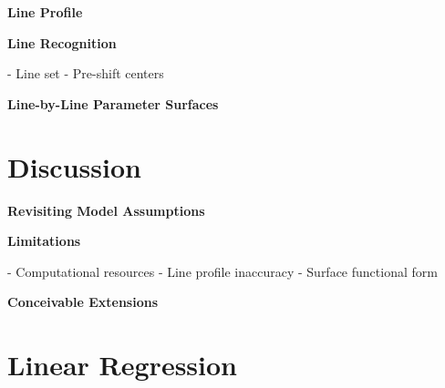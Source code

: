 \documentclass[twocolumn]{aastex631}
\begin{document}
\begin{mdframed}
    \textbf{Line Profile }

    \textcolor{lightgray}{\blindtext}
\end{mdframed}

\begin{mdframed}
    \textbf{Line Recognition}

    - Line set
    - Pre-shift centers

    \textcolor{lightgray}{\blindtext}
\end{mdframed}

\begin{mdframed}
    \textbf{Line-by-Line Parameter Surfaces}

    \textcolor{lightgray}{\blindtext}
\end{mdframed}


\section{Discussion}
\begin{mdframed}
    \textbf{Revisiting Model Assumptions}

   \textcolor{lightgray}{\blindtext}
\end{mdframed}

\begin{mdframed}
    \textbf{Limitations}

    - Computational resources
    - Line profile inaccuracy
    - Surface functional form
    
    \textcolor{lightgray}{\blindtext}
\end{mdframed}


\begin{mdframed}
    \textbf{Conceivable Extensions}

    \textcolor{lightgray}{\blindtext}
\end{mdframed}


\pagebreak
\newpage

\begin{acknowledgments}
    \blindtext
\end{acknowledgments}


\software{}


\clearpage

\appendix
\section{Linear Regression}
\blindtext
\end{document}
